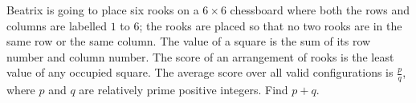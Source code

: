 Beatrix is going to place six rooks on a $6\times6$ chessboard where both the rows and columns are labelled $1$ to $6$; the rooks are placed so that no two rooks are in the same row or the same column. The value of a square is the sum of its row number and column number. The score of an arrangement of rooks is the least value of any occupied square. The average score over all valid configurations is $\frac{p}{q}$,  where $p$ and $q$ are relatively prime positive integers. Find $p+q$.